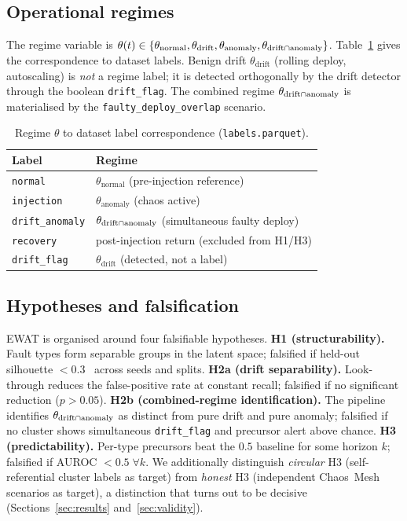 \subsection{Operational regimes}
The regime variable is $\theta(t)\in\{\theta_{\text{normal}},\theta_{\text{drift}},
\theta_{\text{anomaly}},\theta_{\text{drift}\cap\text{anomaly}}\}$. Table~\ref{tab:regimes} gives the correspondence to dataset
labels. Benign drift $\theta_{\text{drift}}$ (rolling deploy, autoscaling) is \emph{not} a regime
label; it is detected orthogonally by the drift detector through the boolean
\texttt{drift\_flag}. The combined regime $\theta_{\text{drift}\cap\text{anomaly}}$ is materialised by the
\texttt{faulty\_deploy\_overlap} scenario.

\begin{table}[t]
\centering
\caption{Regime $\theta$ to dataset label correspondence (\texttt{labels.parquet}).}
\label{tab:regimes}
\small
\begin{tabularx}{\columnwidth}{@{}lX@{}}
\toprule
\textbf{Label} & \textbf{Regime} \\
\midrule
\texttt{normal}        & $\theta_{\text{normal}}$ (pre-injection reference) \\
\texttt{injection}     & $\theta_{\text{anomaly}}$ (chaos active) \\
\texttt{drift\_anomaly}& $\theta_{\text{drift}\cap\text{anomaly}}$ (simultaneous faulty deploy) \\
\texttt{recovery}      & post-injection return (excluded from H1/H3) \\
\texttt{drift\_flag}   & $\theta_{\text{drift}}$ (detected, not a label) \\
\bottomrule
\end{tabularx}
\end{table}

\subsection{Hypotheses and falsification}
\label{sec:hypotheses}
EWAT is organised around four falsifiable hypotheses.
\textbf{H1 (structurability).} Fault types form separable groups in the latent space; falsified if
held-out silhouette $<0.3$~\cite{kaufman1990} across seeds and splits.
\textbf{H2a (drift separability).} Look-through reduces the false-positive rate at constant recall;
falsified if no significant reduction ($p>0.05$).
\textbf{H2b (combined-regime identification).} The pipeline identifies $\theta_{\text{drift}\cap\text{anomaly}}$ as distinct from
pure drift and pure anomaly; falsified if no cluster shows simultaneous
\texttt{drift\_flag} and precursor alert above chance.
\textbf{H3 (predictability).} Per-type precursors beat the $0.5$ baseline for some horizon $k$;
falsified if AUROC $<0.5\;\forall k$. We additionally distinguish \emph{circular} H3
(self-referential cluster labels as target) from \emph{honest} H3 (independent Chaos~Mesh
scenarios as target), a distinction that turns out to be decisive (Sections~\ref{sec:results}
and~\ref{sec:validity}).
